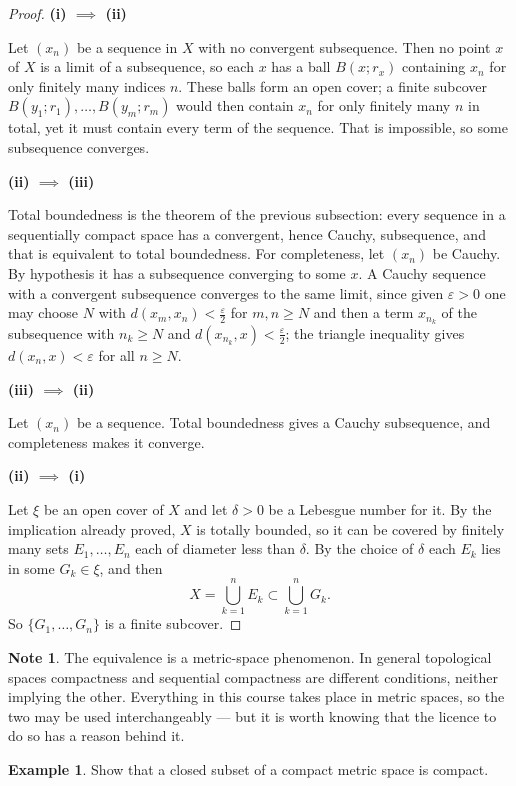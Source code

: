 \documentclass[11pt,a4paper]{article}
\theoremstyle{definition}
\newtheorem{exa}[thm]{Example}
\newtheorem*{note}{Note}
\newcommand{\subhead}[1]{%
  \par\medskip\noindent\textbf{#1}\par\nobreak\smallskip}
\begin{document}
\begin{proof}
\subhead{(i) $\implies$ (ii)}
Let $(x_n)$ be a sequence in $X$ with no convergent subsequence. Then no point
$x$ of $X$ is a limit of a subsequence, so each $x$ has a ball $B(x;r_x)$
containing $x_n$ for only finitely many indices $n$. These balls form an open
cover; a finite subcover $B(y_1;r_1),\dots,B(y_m;r_m)$ would then contain
$x_n$ for only finitely many $n$ in total, yet it must contain every term of the
sequence. That is impossible, so some subsequence converges.

\subhead{(ii) $\implies$ (iii)}
Total boundedness is the theorem of the previous subsection: every sequence in a
sequentially compact space has a convergent, hence Cauchy, subsequence, and that
is equivalent to total boundedness. For completeness, let $(x_n)$ be Cauchy. By
hypothesis it has a subsequence converging to some $x$. A Cauchy sequence with a
convergent subsequence converges to the same limit, since given $\varepsilon>0$
one may choose $N$ with $d(x_m,x_n)<\frac{\varepsilon}{2}$ for $m,n\geq N$ and
then a term $x_{n_k}$ of the subsequence with $n_k\geq N$ and
$d(x_{n_k},x)<\frac{\varepsilon}{2}$; the triangle inequality gives
$d(x_n,x)<\varepsilon$ for all $n\geq N$.

\subhead{(iii) $\implies$ (ii)}
Let $(x_n)$ be a sequence. Total boundedness gives a Cauchy subsequence, and
completeness makes it converge.

\subhead{(ii) $\implies$ (i)}
Let $\xi$ be an open cover of $X$ and let $\delta>0$ be a Lebesgue number for
it. By the implication already proved, $X$ is totally bounded, so it can be
covered by finitely many sets $E_1,\dots,E_n$ each of diameter less than
$\delta$. By the choice of $\delta$ each $E_k$ lies in some $G_k\in\xi$, and
then
$$X = \bigcup_{k=1}^{n}E_k \subset \bigcup_{k=1}^{n}G_k .$$
So $\{G_1,\dots,G_n\}$ is a finite subcover.
\end{proof}

\begin{note}
The equivalence is a metric-space phenomenon. In general topological spaces
compactness and sequential compactness are different conditions, neither
implying the other. Everything in this course takes place in metric spaces, so
the two may be used interchangeably --- but it is worth knowing that the licence
to do so has a reason behind it.
\end{note}

\begin{exa}
Show that a closed subset of a compact metric space is compact.
\end{exa}
\end{document}
